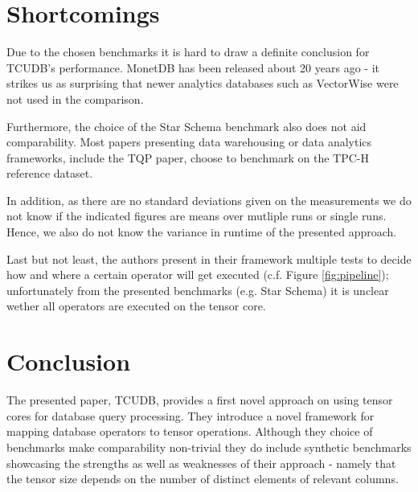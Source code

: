 \documentclass{paper}
\begin{document}
	
	\section{Shortcomings}
	
	Due to the chosen benchmarks it is hard to draw a definite conclusion for TCUDB's performance. MonetDB has been released about 20 years ago - it strikes us as surprising that newer analytics databases such as VectorWise were not used in the comparison.
	
	Furthermore, the choice of the Star Schema benchmark also does not aid comparability. Most papers presenting data warehousing or data analytics frameworks, include the TQP paper, choose to benchmark on the TPC-H \cite{specification1993tpc} reference dataset.
	
	In addition, as there are no standard deviations given on the measurements we do not know if the indicated figures are means over mutliple runs or single runs. Hence, we also do not know the variance in runtime of the presented approach. 
	
	Last but not least, the authors present in their framework multiple tests to decide how and where a certain operator will get executed (c.f. Figure \ref{fig:pipeline}); unfortunately from the presented benchmarks (e.g. Star Schema) it is unclear wether all operators are executed on the tensor core.
	
	
	\section{Conclusion}
	
	The presented paper, TCUDB, provides a first novel approach on using tensor cores for database query processing. They introduce a novel framework for mapping database operators to tensor operations. Although they choice of benchmarks make comparability non-trivial they do include synthetic benchmarks showcasing the strengths as well as weaknesses of their approach - namely that the tensor size depends on the number of distinct elements of relevant columns.
	


	
\end{document}
